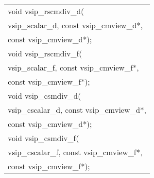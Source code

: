 {\begin{tabular}[H]{l}
void vsip\_rscmdiv\_d(\\*\hspace{1cm}vsip\_scalar\_d, const vsip\_cmview\_d*,\\*\hspace{1cm}const vsip\_cmview\_d*);\\
void vsip\_rscmdiv\_f(\\*\hspace{1cm}vsip\_scalar\_f, const vsip\_cmview\_f*,\\*\hspace{1cm}const vsip\_cmview\_f*);\\
void vsip\_csmdiv\_d(\\*\hspace{1cm}vsip\_cscalar\_d, const vsip\_cmview\_d*,\\*\hspace{1cm}const vsip\_cmview\_d*);\\
void vsip\_csmdiv\_f(\\*\hspace{1cm}vsip\_cscalar\_f, const vsip\_cmview\_f*,\\*\hspace{1cm}const vsip\_cmview\_f*);\\
\end{tabular}
}
\pyjvsiph